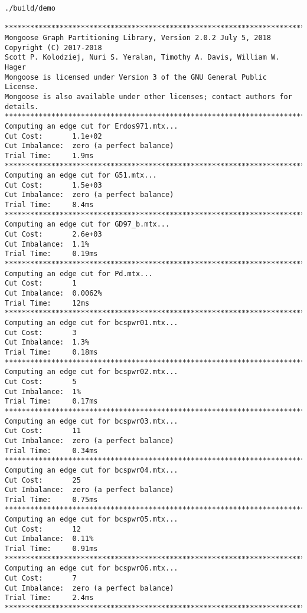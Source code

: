 \documentclass[letter]{article}
\begin{document}
\begin{lstlisting}[numbers=none,xleftmargin=.09\textwidth, xrightmargin=.09\textwidth,keywordstyle=\color{black}]
./build/demo

********************************************************************************
Mongoose Graph Partitioning Library, Version 2.0.2 July 5, 2018
Copyright (C) 2017-2018
Scott P. Kolodziej, Nuri S. Yeralan, Timothy A. Davis, William W. Hager
Mongoose is licensed under Version 3 of the GNU General Public License.
Mongoose is also available under other licenses; contact authors for details.
********************************************************************************
Computing an edge cut for Erdos971.mtx...
Cut Cost:       1.1e+02
Cut Imbalance:  zero (a perfect balance)
Trial Time:     1.9ms
********************************************************************************
Computing an edge cut for G51.mtx...
Cut Cost:       1.5e+03
Cut Imbalance:  zero (a perfect balance)
Trial Time:     8.4ms
********************************************************************************
Computing an edge cut for GD97_b.mtx...
Cut Cost:       2.6e+03
Cut Imbalance:  1.1%
Trial Time:     0.19ms
********************************************************************************
Computing an edge cut for Pd.mtx...
Cut Cost:       1
Cut Imbalance:  0.0062%
Trial Time:     12ms
********************************************************************************
Computing an edge cut for bcspwr01.mtx...
Cut Cost:       3
Cut Imbalance:  1.3%
Trial Time:     0.18ms
********************************************************************************
Computing an edge cut for bcspwr02.mtx...
Cut Cost:       5
Cut Imbalance:  1%
Trial Time:     0.17ms
********************************************************************************
Computing an edge cut for bcspwr03.mtx...
Cut Cost:       11
Cut Imbalance:  zero (a perfect balance)
Trial Time:     0.34ms
********************************************************************************
Computing an edge cut for bcspwr04.mtx...
Cut Cost:       25
Cut Imbalance:  zero (a perfect balance)
Trial Time:     0.75ms
********************************************************************************
Computing an edge cut for bcspwr05.mtx...
Cut Cost:       12
Cut Imbalance:  0.11%
Trial Time:     0.91ms
********************************************************************************
Computing an edge cut for bcspwr06.mtx...
Cut Cost:       7
Cut Imbalance:  zero (a perfect balance)
Trial Time:     2.4ms
********************************************************************************

\end{lstlisting}
\end{document}

